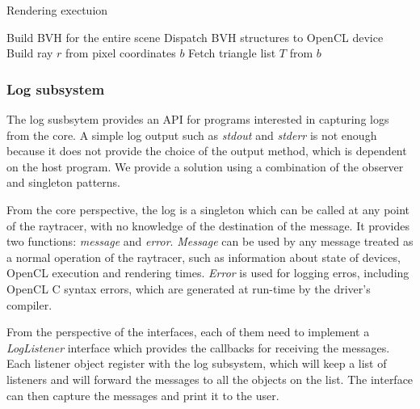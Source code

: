 \documentclass[a4paper]{sbgames}               %
\begin{document}
\begin{algorithm}
\caption{Rendering exectuion}
\label{alg:rendering}
\begin{algorithmic}[1]
\State Build BVH for the entire scene
\State Dispatch BVH structures to OpenCL device
\EndProcedure
{}
\State Build ray $r$ from pixel coordinates
\Return $b$
\EndIf
\EndFor
\State Fetch triangle list $T$ from $b$
\EndIf
\EndFor
\EndFor
\EndProcedure
\end{algorithmic}
\end{algorithm}


\subsubsection{Log subsystem}

The log susbsytem provides an API for programs interested in capturing
logs from the core. A simple log output such as \emph{stdout} and
\emph{stderr} is not enough because it does not provide the choice of
the output method, which is dependent on the host program. We provide
a solution using a combination of the observer and singleton patterns.

From the core perspective, the log is a singleton which can be called
at any point of the raytracer, with no knowledge of the destination of
the message. It provides two functions: \emph{message} and
\emph{error}. \emph{Message} can be used by any message treated as a normal
operation of the raytracer, such as information about state of
devices, OpenCL execution and rendering times. \emph{Error} is used for
logging erros, including OpenCL C syntax errors, which are generated at
run-time by the driver's compiler.

From the perspective of the interfaces, each of them need to implement
a \emph{LogListener} interface which provides the callbacks for
receiving the messages. Each listener object register with the log
subsystem, which will keep a list of listeners and will forward the
messages to all the objects on the list. The interface can then
capture the messages and print it to the user.
\end{document}
